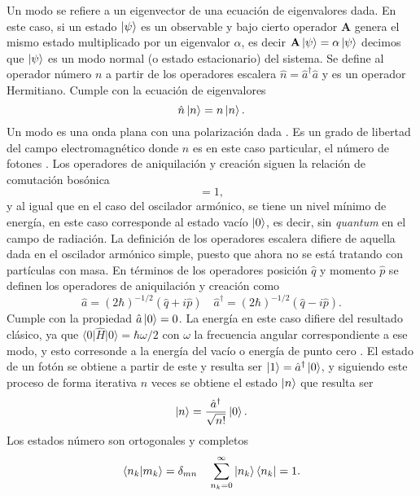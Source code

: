 Un modo se refiere a un eigenvector de una ecuación de eigenvalores dada. En este caso, si un estado $\ket{\psi}$ es un observable y bajo cierto operador $\mathbf{A}$ genera el mismo estado multiplicado por un eigenvalor $\alpha$, es decir $\mathbf{A}\ket{\psi} = \alpha \ket{\psi}$ decimos que $\ket{\psi}$ es un modo normal (o estado estacionario) del sistema.
Se define al operador número $n$ a partir de los operadores escalera $\hat{n} = \hat{a}^{\dagger}\hat{a}$ y es un operador Hermitiano. Cumple con la ecuación de eigenvalores %
\begin{equation*}
  \hat{n}\ket{n} = n \ket{n}.
\end{equation*}
Un modo es una onda plana con una polarización dada \cite{Agarwal_2012}. Es un grado de libertad del campo electromagnético donde $n$ es en este caso particular, el número de fotones \cite{Leonhardt}. Los operadores de aniquilación y creación siguen la relación de comutación bosónica
\begin{equation*}
  [\hat{a}, \hat{a}^{\dagger}] = 1,
\end{equation*}
y al igual que en el caso del oscilador armónico, se tiene un nivel mínimo de energía, en este caso corresponde al estado vacío $\ket{0}$, es decir, sin \textit{quantum} en el campo de radiación. La definición de los operadores escalera difiere de aquella dada en el oscilador armónico simple, puesto que ahora no se está tratando con partículas con masa. En términos de los operadores posición $\hat{q}$ y momento $\hat{p}$ se definen los operadores de aniquilación y creación como
\begin{equation}\label{eq:crea-anni-def}
  \hat{a} = (2\hbar)^{-1/2}(\hat{q} + i\hat{p}) \quad \hat{a}^{\dagger} = (2\hbar)^{-1/2}(\hat{q} - i\hat{p}).
\end{equation} %
Cumple con la propiedad $\hat{a} \ket{0} = 0$. La energía en este caso difiere del resultado clásico, ya que $\langle 0\vert\hat{H}\vert 0\rangle = \hbar\omega/2$ con $\omega$ la frecuencia angular correspondiente a ese modo, y esto corresonde a la energía del vacío o energía de punto cero \cite{Walls}. El estado de un fotón se obtiene a partir de este y resulta ser $\ket{1} = \hat{a}^{\dagger} \ket{0}$, y siguiendo este proceso de forma iterativa $n$ veces se obtiene el estado $\ket{n}$ que resulta ser
\begin{equation*}
  \ket{n} = \frac{\hat{a}^{\dagger}}{\sqrt{n!}}\ket{0}.
\end{equation*}
Los estados número son ortogonales y completos
\begin{equation*}
  \braket{n_k}{m_k} = \delta_{mn} \quad \sum_{n_k = 0}^{\infty} \ket{n_k} \bra{n_k} = 1.
\end{equation*}
